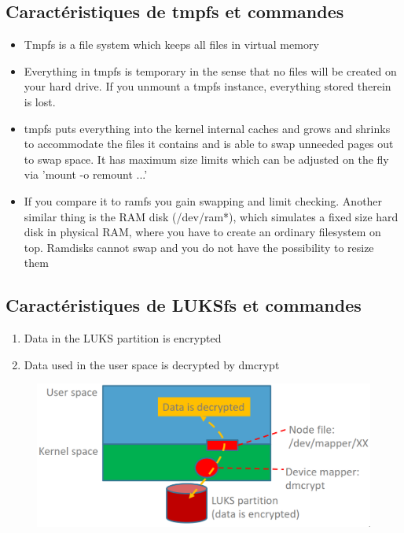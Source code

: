 \documentclass[resume]{subfiles}
\begin{document}
\subsection{Caractéristiques de tmpfs et commandes}
\begin{itemize}
    \item Tmpfs is a file system which keeps all files in virtual memory
    \item Everything in tmpfs is temporary in the sense that no files will be created on your hard drive. If you unmount a tmpfs instance, everything stored therein is lost.
    \item tmpfs puts everything into the kernel internal caches and grows and shrinks to accommodate the files it contains and is able to swap unneeded pages out to swap space. It has maximum size limits which can be adjusted on the fly via 'mount -o remount ...’
    \item If you compare it to ramfs you gain swapping and limit checking. Another similar thing is the RAM disk (/dev/ram*), which simulates a fixed size hard disk in physical RAM, where you have to create an ordinary filesystem on top. Ramdisks cannot swap and you do not have the possibility to resize them
\end{itemize}


\subsection{Caractéristiques de LUKSfs et commandes}
\begin{enumerate}
	\item Data in the LUKS partition is encrypted
	\item Data used in the user space is decrypted by dmcrypt
\end{enumerate}

\begin{figure}[H]
    \centering
    \includegraphics[width=0.75\columnwidth]{Figures/fileSystem/luksFct.png}
    \label{fig:luksFct}
\end{figure}
\end{document}
